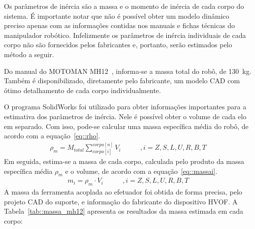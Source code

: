 Os parâmetros de inércia são a massa e o momento de inércia de cada corpo do
sistema. É importante notar que não é possível obter um modelo dinâmico preciso
apenas com as informações contidas nos manuais e fichas técnicas do manipulador
robótico. Infelizmente os parâmetros de inércia individuais de cada corpo não
são fornecidos pelos fabricantes e, portanto, serão estimados pelo método a
seguir.

Do manual do MOTOMAN MH12~\cite{manualmh12}, informa-se a massa total do robô,
de 130~kg. Também é disponibilizado, diretamente pelo fabricante, um modelo CAD
com ótimo detalhamento de cada corpo individualmente.

O programa SolidWorks foi utilizado para obter informações importantes para a
estimativa dos parâmetros de inércia. Nele é possível obter o volume de cada elo
em separado. Com isso, pode-se calcular uma massa específica média do robô, de
acordo com a equação~\ref{eq::rho}.
\begin{align}
	\rho_{m} = M_{total}\sum_{corpo[i]}^{corpo[n]} V_{i} \label{eq::rho} \qquad & ,
	i = Z,S,L,U,R,B,T
\end{align}
%
Em seguida, estima-se a massa de cada corpo, calculada pelo produto da massa
específica média $\rho_{m}$ e o volume, de acordo com a
equação~\ref{eq::massai}.
%
\begin{align}
	m_{i} = \rho_{m} \cdot V_{i} \label{eq::massai} \qquad &, i =
	Z,S,L,U,R,B,T
\end{align}
%
A massa da ferramenta acoplada ao efetuador foi obtida de forma precisa,
pelo projeto CAD do suporte, e informação do fabricante do dispositivo
HVOF.
A Tabela~\ref{tab::massa_mh12} apresenta os resultados da massa estimada em cada
corpo:
%
